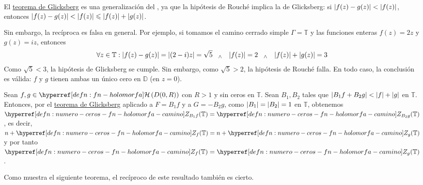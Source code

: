 \begin{obs}
    El \hyperref[teo:glicksberg]{teorema de Glicksberg} es una generalización del , ya que la hipótesis de Rouché implica la de Glicksberg: si $\left|f(z) - g(z)\right| < \left|f(z)\right|$, entonces $\left|f(z) - g(z)\right| < \left|f(z)\right| \leqslant \left|f(z)\right| + \left|g(z)\right|$.

    Sin embargo, la recíproca es falsa en general. Por ejemplo, si tomamos el camino cerrado simple $\Gamma = \mathbb{T}$ y las funciones enteras $f(z) = 2z$ y $g(z) = iz$, entonces
    \[
    \forall z \in \mathbb{T} : \left|f(z) - g(z)\right| = \left|(2-i)z\right| = \sqrt{5} \;\;\; _{\wedge} \;\;\; \left|f(z)\right| = 2 \;\;\; _{\wedge} \;\;\; \left|f(z)\right| + \left|g(z)\right| = 3
    \]
    Como $\sqrt{5} < 3$, la hipótesis de Glicksberg se cumple. Sin embargo, como $\sqrt{5} > 2$, la hipótesis de Rouché falla. En todo caso, la conclusión es válida: $f$ y $g$ tienen ambas un único cero en $\mathbb{D}$ (en $z = 0$).
\end{obs}

\begin{obs}\label{obs:challener-rubel-implica-glicksberg}
    Sean $f, g \in \exhyperref[defn:fn-holomorfa]{fn-holomorfa}{\mathcal{H}} \left(D(0, R)\right)$ con $R> 1$ y sin ceros en $\mathbb{T}$. Sean $B_1, B_2$  tales que $\left|B_1 f + B_2 g\right| < \left|f\right| + \left|g\right|$ en $\mathbb{T}$. Entonces, por el \hyperref[teo:glicksberg]{teorema de Glicksberg} aplicado a $F = B_1 f$ y a $G = -B_2 g$, como $\left|B_1\right| = \left|B_2\right| = 1$ en $\mathbb{T}$, obtenemos $\exhyperref[defn:numero-ceros-fn-holomorfa-camino]{numero-ceros-fn-holomorfa-camino}{Z_{B_1 f}}(\mathbb{T}) = \exhyperref[defn:numero-ceros-fn-holomorfa-camino]{numero-ceros-fn-holomorfa-camino}{Z_{B_2 g}}(\mathbb{T})$, es decir, $n + \exhyperref[defn:numero-ceros-fn-holomorfa-camino]{numero-ceros-fn-holomorfa-camino}{Z_f}(\mathbb{T}) = n + \exhyperref[defn:numero-ceros-fn-holomorfa-camino]{numero-ceros-fn-holomorfa-camino}{Z_g}(\mathbb{T})$ y por tanto $\exhyperref[defn:numero-ceros-fn-holomorfa-camino]{numero-ceros-fn-holomorfa-camino}{Z_f}(\mathbb{T}) = \exhyperref[defn:numero-ceros-fn-holomorfa-camino]{numero-ceros-fn-holomorfa-camino}{Z_g}(\mathbb{T})$.

    Como muestra el siguiente teorema, el recíproco de este resultado también es cierto.
\end{obs}

